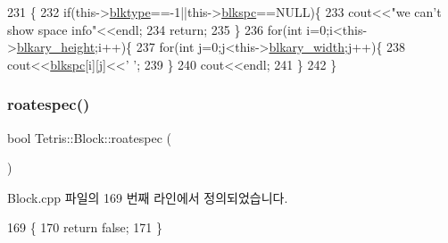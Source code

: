 \begin{DoxyCode}
231                              \{
232                 \textcolor{keywordflow}{if}(this->\hyperlink{class_tetris_1_1_block_aceac58dcf8d8afaa82c2bab101cb3cff}{blktype}==-1||this->\hyperlink{class_tetris_1_1_block_af2f96c83a3511d32321672f794aa4db1}{blkspc}==NULL)\{
233                     cout<<\textcolor{stringliteral}{"we can't show space info"}<<endl;
234                     \textcolor{keywordflow}{return};
235                 \}
236                 \textcolor{keywordflow}{for}(\textcolor{keywordtype}{int} i=0;i<this->\hyperlink{class_tetris_1_1_block_abbea7737c2b1fb7339aab4dff13de27c}{blkary\_height};i++)\{
237                     \textcolor{keywordflow}{for}(\textcolor{keywordtype}{int} j=0;j<this->\hyperlink{class_tetris_1_1_block_a96548cab58eb788af744b54192c7bea1}{blkary\_width};j++)\{
238                         cout<<\hyperlink{class_tetris_1_1_block_af2f96c83a3511d32321672f794aa4db1}{blkspc}[i][j]<<\textcolor{charliteral}{' '};
239                     \}
240                     cout<<endl;
241                 \}
242             \}
\end{DoxyCode}
\mbox{\label{class_tetris_1_1_block_a787424e5e9ec2807989121e8dcee1a7a}} 
\subsubsection{\texorpdfstring{roatespec()}{roatespec()}\hspace{0.1cm}{\footnotesize\ttfamily [1/2]}}
{\footnotesize\ttfamily bool Tetris\+::\+Block\+::roatespec (\begin{DoxyParamCaption}{ }\end{DoxyParamCaption})}



Block.\+cpp 파일의 169 번째 라인에서 정의되었습니다.


\begin{DoxyCode}
169                          \{
170                 \textcolor{keywordflow}{return} \textcolor{keyword}{false};
171             \}
\end{DoxyCode}
\mbox{\label{class_tetris_1_1_block_a787424e5e9ec2807989121e8dcee1a7a}} 
